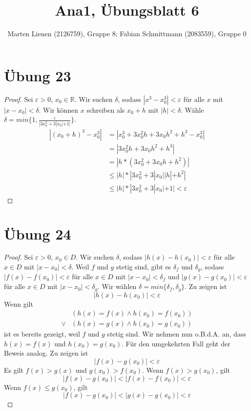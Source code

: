 \documentclass[a4paper,10pt]{article}
\title{Ana1, Übungsblatt 6}
\author{Marten Lienen (2126759), Gruppe 8; Fabian Schmittmann (2083559), Gruppe 0}
\begin{document}
\maketitle

\section*{Übung 23}

\begin{proof}
 Sei $\varepsilon > 0$, $x_0 \in \mathbb{R}$.
 Wir suchen $\delta$, sodass $|x^3 - x_0^3| < \varepsilon$ für alle $x$ mit $|x - x_0| < \delta$.
 Wir können $x$ schreiben als $x_0 + h$ mit $|h| < \delta$.
 Wähle $\delta = min \{1, \frac{\varepsilon}{|3x_0^2 + 3|x_0| + 1|} \}$.
 \begin{align*}
  |(x_0 + h)^3 - x_0^3| & = |x_0^3 + 3x_0^2h + 3x_0h^2 + h^3 - x_0^3|\\
  & = |3x_0^2h + 3x_0h^2 + h^3|\\
  & = |h * (3x_0^2 + 3x_0h + h^2)|\\
  & \le |h| * |3x_0^2 + 3|x_0||h| + h^2|\\
  & \le |h| * |3x_0^2 + 3|x_0| + 1|< \varepsilon
 \end{align*}
\end{proof}

\section*{Übung 24}

\begin{proof}
 Sei $\varepsilon > 0$, $x_0 \in D$.
 Wir suchen $\delta$, sodass $|h(x) - h(x_0)| < \varepsilon$ für alle $x \in D$ mit $|x - x_0| < \delta$.
 Weil $f$ und $g$ stetig sind, gibt es $\delta_f$ und $\delta_g$, sodass $|f(x) - f(x_0)| < \varepsilon$ für alle $x \in D$ mit $|x - x_0| < \delta_f$ und $|g(x) - g(x_0)| < \varepsilon$ für alle $x \in D$ mit $|x - x_0| < \delta_g$.
 Wir wählen $\delta = min \{\delta_f, \delta_g\}$.
 Zu zeigen ist
 \begin{equation}
  |h(x) - h(x_0)| < \varepsilon
 \end{equation}
 Wenn gilt
 \begin{align*}
  & (h(x) = f(x) \land h(x_0) = f(x_0))\\
  \lor & (h(x) = g(x) \land h(x_0) = g(x_0))
 \end{align*}
 ist es bereits gezeigt, weil $f$ und $g$ stetig sind.
 Wir nehmen nun o.B.d.A. an, dass $h(x) = f(x)$ und $h(x_0) = g(x_0)$.
 Für den umgekehrten Fall geht der Beweis analog.
 Zu zeigen ist
 \begin{equation}
  |f(x) - g(x_0)| < \varepsilon
 \end{equation}
 Es gilt $f(x) > g(x)$ und $g(x_0) > f(x_0)$.
 Wenn $f(x) > g(x_0)$, gilt
 \begin{equation}
  |f(x) - g(x_0)| < |f(x) - f(x_0)| < \varepsilon
 \end{equation}
 Wenn $f(x) \le g(x_0)$, gilt
 \begin{equation}
  |f(x) - g(x_0)| < |g(x) - g(x_0)| < \varepsilon
 \end{equation}
\end{proof}
\end{document}
